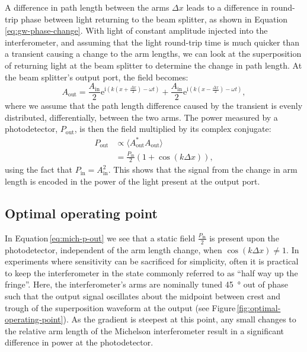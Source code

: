 A difference in path length between the arms $\Delta x$ leads to a difference in round-trip phase between light returning to the beam splitter, as shown in Equation\,\ref{eq:gw-phase-change}. With light of constant amplitude injected into the interferometer, and assuming that the light round-trip time is much quicker than a transient causing a change to the arm lengths, we can look at the superposition of returning light at the beam splitter to determine the change in path length. At the beam splitter's output port, the field becomes:
\begin{equation}
  A_{\text{out}} = \frac{A_{\text{in}}}{2} \text{e}^{\text{i} \left( k \left( x + \frac{\Delta x}{2} \right) - \omega t \right)} + \frac{A_{\text{in}}}{2} \text{e}^{\text{i} \left( k \left( x - \frac{\Delta x}{2} \right) - \omega t \right)},
\end{equation}
where we assume that the path length difference caused by the transient is evenly distributed, differentially, between the two arms. The power measured by a photodetector, $P_{\text{out}}$, is then the field multiplied by its complex conjugate:
\begin{equation}
  \label{eq:mich-p-out}
  \begin{split}
    P_{\text{out}} &\propto \langle A_{\text{out}}^*A_{\text{out}} \rangle \\
                   &= \frac{P_{\text{in}}}{2} \left( 1 + \cos \left( k \Delta x \right) \right),
  \end{split}
\end{equation}
using the fact that $P_{\text{in}} = A_{\text{in}}^2$. This shows that the signal from the change in arm length is encoded in the power of the light present at the output port.

\subsection{\label{sec:operating-point}Optimal operating point}
In Equation\,\ref{eq:mich-p-out} we see that a static field $\frac{P_{\text{in}}}{2}$ is present upon the photodetector, independent of the arm length change, when $\cos \left( k \Delta x \right) \neq 1$. In experiments where sensitivity can be sacrificed for simplicity, often it is practical to keep the interferometer in the state commonly referred to as ``half way up the fringe''. Here, the interferometer's arms are nominally tuned \SI{45}{\degree} out of phase such that the output signal oscillates about the midpoint between crest and trough of the superposition waveform at the output (see Figure\,\ref{fig:optimal-operating-point}). As the gradient is steepest at this point, any small changes to the relative arm length of the Michelson interferometer result in a significant difference in power at the photodetector.


